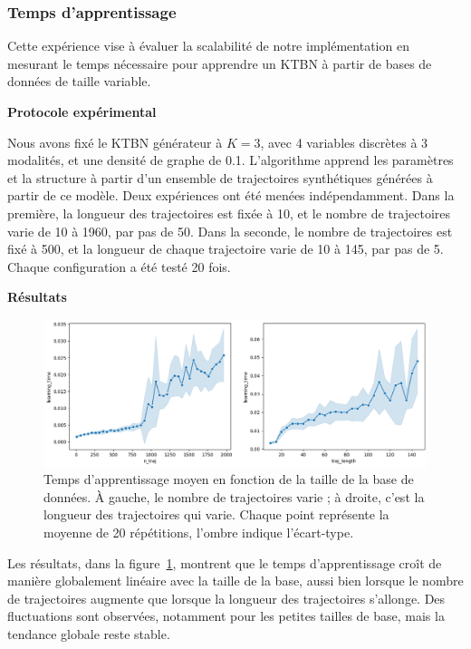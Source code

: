 \documentclass{article}
\begin{document}
\subsubsection{Temps d'apprentissage}

Cette expérience vise à évaluer la scalabilité de notre implémentation en mesurant le temps nécessaire pour apprendre
un KTBN à partir de bases de données de taille variable.

\textbf{Protocole expérimental}

Nous avons fixé le KTBN générateur à $K = 3$, avec 4 variables discrètes à 3 modalités, et une densité de
graphe de 0.1. L'algorithme apprend les paramètres et la structure à partir d'un ensemble de trajectoires synthétiques
générées à partir de ce modèle. Deux expériences ont été menées indépendamment. Dans la première, la longueur des
trajectoires est fixée à 10, et le nombre de trajectoires varie de 10 à 1960, par pas de 50. Dans la seconde, le nombre
de trajectoires est fixé à 500, et la longueur de chaque trajectoire varie de 10 à 145, par pas de 5. Chaque configuration
a été testé 20 fois.

\textbf{Résultats}

\begin{figure}[ht]
    \centering
    \includegraphics[width=\linewidth]{img/learning_time.png}
    \caption{Temps d'apprentissage moyen en fonction de la taille de la base de données.
        À gauche, le nombre de trajectoires varie ; à droite, c'est la longueur des trajectoires qui varie.
        Chaque point représente la moyenne de 20 répétitions, l'ombre indique l'écart-type.}
    \label{fig:learning}
\end{figure}

Les résultats, dans la figure~\ref{fig:learning}, montrent que le temps d'apprentissage croît de manière globalement
linéaire avec la taille de la base, aussi bien lorsque le nombre de trajectoires augmente que lorsque la longueur des
trajectoires s'allonge. Des fluctuations sont observées, notamment pour les petites tailles de base, mais la tendance
globale reste stable.
\end{document}
